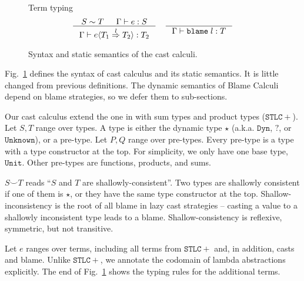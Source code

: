 \documentclass[acmsmall,review,anonymous]{acmart}\settopmatter{printfolios=true,printccs=false,printacmref=false}
\newcommand{\figref}[1]{Fig.~\ref{#1}}
\newcommand{\judgetype}[3]{#1 \vdash #2 : #3}
\newcommand{\POOunit}[0]{\mathtt{Unit}}
\newcommand{\eOOcast}[4]{#1 \langle \cOOcast{#2}{#3}{#4} \rangle}
\newcommand{\eOOblame}[1]{\mathtt{blame} \; #1}
\newcommand{\cOOcast}[3]{#1 \overset{#2}{\Rightarrow} #3}
\begin{document}
\begin{figure}
	Term typing
	\fbox{$ \judgetype{\Gamma}{e}{T} $}
	\begin{gather*}
		\inference{
			S \sim T & \Gamma \vdash e : S 
		}{
			\judgetype{\Gamma}{\eOOcast{e}{T_1}{l}{T_2}}{T_2}
		} \quad
		\inference{
		}{
			\judgetype{\Gamma}{\eOOblame{l}}{T}
		}
	\end{gather*}
	
	\caption{Syntax and static semantics of the cast calculi.}
	\label{fig:blame-static}
\end{figure}

\figref{fig:blame-static} defines the syntax of cast calculus and its
static semantics. It is little changed from previous definitions.
  The dynamic semantics of Blame Calculi
depend on blame strategies, so we defer them to sub-sections.

Our cast calculus extend the one in \citet{siek2009exploring} with sum types 
and product types ($ \mathtt{STLC+} $). 
Let $ S,T $ range over types. A type is either the dynamic type $ \star $
(a.k.a. $ \mathtt{Dyn} $, $ \mathbb{?} $, or $ \mathtt{Unknown} $), 
or a pre-type. 
Let $ P,Q $ range over pre-types. Every pre-type is a type with a type 
constructor at the top. For simplicity, we only have one base type, $ \POOunit 
$. 
Other pre-types are functions, products, and sums.


$ S \smile T $ reads ``$ S $ and $ T $ are shallowly-consistent''. Two types 
are shallowly consistent if one of them is $ \star $, or they have the same 
type constructor at the top. Shallow-inconsistency is the root of all blame in 
lazy cast strategies -- casting a value to a shallowly inconsistent type leads 
to a blame. Shallow-consistency is reflexive, symmetric, but 
not transitive.

Let $ e $ ranges over terms, including all terms from $ \mathtt{STLC+} $ and, 
in addition, casts and blame. Unlike $ \mathtt{STLC+} $, we annotate the 
codomain of lambda abstractions explicitly.
The end of \figref{fig:blame-static} shows the typing rules for the
additional terms.
\end{document}
